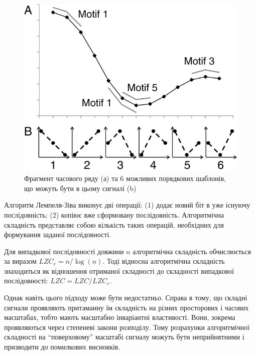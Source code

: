 \documentclass[
  letterpaper,
]{report}
\begin{document}
\begin{figure}

{\centering 

\includegraphics{Images/lab_4/Permutation-entropy-method-Permutation-entropy-PE-was-calculated-for-both-unaveraged.png}

}

\caption{\label{fig-permutation}Фрагмент часового ряду (а) та 6 можливих
порядкових шаблонів, що можуть бути в цьому сигналі (b)}

\end{figure}

Алгоритм Лемпеля-Зіва виконує дві операції: (1) додає новий біт в уже
існуючу послідовність; (2) копіює вже сформовану послідовність.
Алгоритмічна складність представляє собою кількість таких операцій,
необхідних для формування заданої послідовності.

Для випадкової послідовності довжини \(n\) алгоритмічна складність
обчислюється за виразом \(LZC_r = n / \log(n)\). Тоді відносна
алгоритмічна складність знаходиться як відношення отриманої складності
до складності випадкової послідовності: \(LZC = LZC / LZC_{r}\).

Однак навіть цього підходу може бути недостатньо. Справа в тому, що
складні сигнали проявляють притаманну їм складність на різних
просторових і часових масштабах, тобто мають масштабно інваріантні
властивості. Вони, зокрема проявляються через степеневі закони
розподілу. Тому розрахунки алгоритмічної складності на ``поверховому''
масштабі сигналу можуть бути неприйнятними і призводити до помилкових
висновків.
\end{document}
